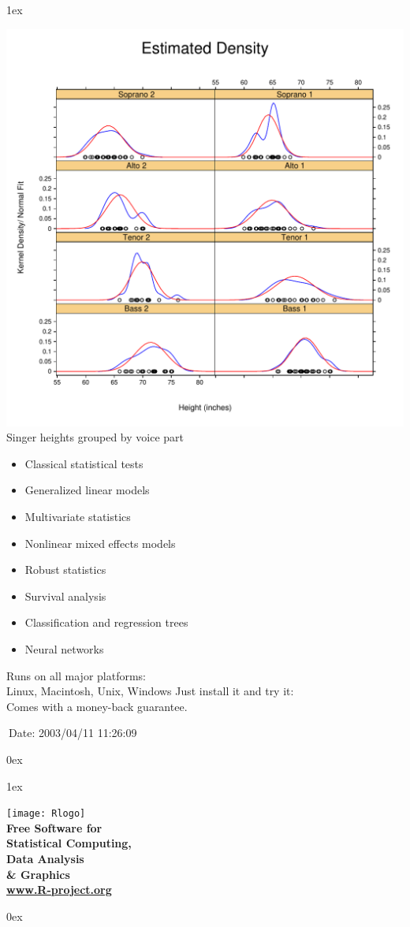 \documentclass[landscape]{article}
\newlength{\colw}
\newcommand{\column}[1]{\hspace*{9mm}{}
  \parbox[t][0.99\textheight][t]{\colw}{\parskip1ex
    #1\parskip0ex}\hspace{9mm}{}}
\begin{document}
\column{
  \begin{center}
    \footnotesize\sf
    \includegraphics[width=\colw]{lattice-density}
    Singer heights grouped by voice part
  \end{center}

  \vfill
  \flushleft
  \begin{itemize}
   \item Classical statistical tests
   \item Generalized linear models
   \item Multivariate statistics
   \item Nonlinear mixed effects models
   \item Robust statistics
   \item Survival analysis
   \item Classification and regression trees
   \item Neural networks
  \end{itemize}
  \vfill
  Runs on all major platforms:\\
  Linux, Macintosh, Unix, Windows
  \vfill
  Just install it and try it:\\  Comes with a money-back guarantee.

  \begin{flushright}\tiny
   $\ $Date: 2003/04/11 11:26:09 $\ $
  \end{flushright}
}
\column{
    \vfill
  \begin{center}
    \texttt{[image: Rlogo]}\\[2cm]
    \bf
    \Large
    Free Software for\\[1cm]
    \Huge
    Statistical Computing,\\ Data Analysis\\ \& Graphics\\[1cm]
    \Large
    \url{www.R-project.org}
  \end{center}
  \vfill
  }
\end{document}
